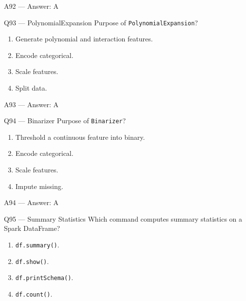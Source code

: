 \documentclass[aspectratio=169,10pt]{beamer}
\begin{document}
	\begin{frame}{A92 — Answer: A}
	\end{frame}
	
	\begin{frame}{Q93 — PolynomialExpansion}
		Purpose of \texttt{PolynomialExpansion}?
		\begin{enumerate}[label=\Alph*.]
			\item Generate polynomial and interaction features.
			\item Encode categorical.
			\item Scale features.
			\item Split data.
		\end{enumerate}
	\end{frame}
	
	\begin{frame}{A93 — Answer: A}
	\end{frame}
	
	\begin{frame}{Q94 — Binarizer}
		Purpose of \texttt{Binarizer}?
		\begin{enumerate}[label=\Alph*.]
			\item Threshold a continuous feature into binary.
			\item Encode categorical.
			\item Scale features.
			\item Impute missing.
		\end{enumerate}
	\end{frame}
	
	\begin{frame}{A94 — Answer: A}
	\end{frame}
	
	
	\begin{frame}{Q95 — Summary Statistics}
		Which command computes summary statistics on a Spark DataFrame?
		\begin{enumerate}[label=\Alph*.]
			\item \texttt{df.summary()}.
			\item \texttt{df.show()}.
			\item \texttt{df.printSchema()}.
			\item \texttt{df.count()}.
		\end{enumerate}
	\end{frame}
	
\end{document}
